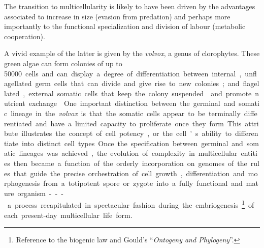 \documentclass{tufte-book}
\begin{document}
The transition to multicellularity is likely to have been driven by the
advantages associated to increase in size (evasion from predation) and perhaps
more importantly to the functional specialization and division of labour
(metabolic cooperation).

A vivid example of the latter is given by the \emph{volvox}, a genus of
clorophytes.  These green algae can form colonies of up to \SI{50000} cells and
can display a degree of differentiation between internal, unflagellated germ
cells that can divide and give rise to new colonies; and flagellated, external
somatic cells that keep the colony suspended\cite{kirk_volvox:_2005} and promote
nutrient exchange.\cite{solari_multicellularity_2006}

One important distinction between the germinal and somatic lineage in the
\emph{volvox} is that the somatic cells appear to be terminally differentiated
and have a limited capacity to proliferate once they form.  This attribute
illustrates the concept of cell potency, or the cell's ability to differentiate
into distinct cell types.

Once the specification between germinal and somatic lineages was achieved, the
evolution of complexity in multicellular entities then became a function of the
orderly incorporation on genomes of the rules that guide the precise
orchestration of cell growth, differentiation and morphogenesis from a
totipotent spore or zygote into a fully functional and mature organism---a
process recapitulated in spectacular fashion during the
embriogenesis\footnote{ Reference to the biogenic law and
  Gould's ``\emph{Ontogeny and Phylogeny}''.}  of each \mbox{present-day}
multicellular life form.





\end{document}
